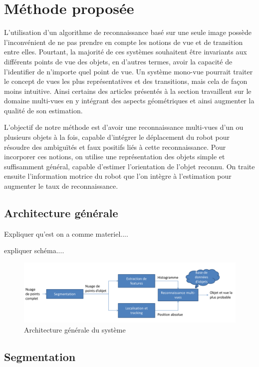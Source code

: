 
\chapter{Méthode proposée}

L'utilisation d'un algorithme de reconnaissance basé sur une seule image possède l'inconvénient de ne pas prendre en compte les notions de vue et de transition entre elles. Pourtant, la majorité de ces systèmes souhaitent être invariants aux différents points de vue des objets, en d'autres termes, avoir la capacité de l'identifier de n'importe quel point de vue. Un système mono-vue pourrait traiter le concept de vues les plus représentatives et des transitions, mais cela de façon moins intuitive. Ainsi certains des articles présentés à la section \celine{\ref{}} travaillent sur le domaine multi-vues en y intégrant des aspects géométriques et ainsi augmenter la qualité de son estimation. 

L'objectif de notre méthode est d'avoir une reconnaissance multi-vues d'un ou plusieurs objets à la fois, capable d'intégrer le déplacement du robot pour résoudre des ambiguïtés et faux positifs liés à cette reconnaissance. Pour incorporer ces notions, on utilise une représentation des objets simple et suffisamment général, capable d'estimer l'orientation de l'objet reconnu. On traite ensuite l’information motrice du robot que l'on intègre à l'estimation pour augmenter le taux de reconnaissance.

\section{Architecture générale}
Expliquer qu'est on a comme materiel....

expliquer schéma....

\begin{figure}[H]
  \centering
  \includegraphics[width=\textwidth]{gen_arc.pdf}
  \caption{Architecture générale du système}
\end{figure}

\section{Segmentation}

